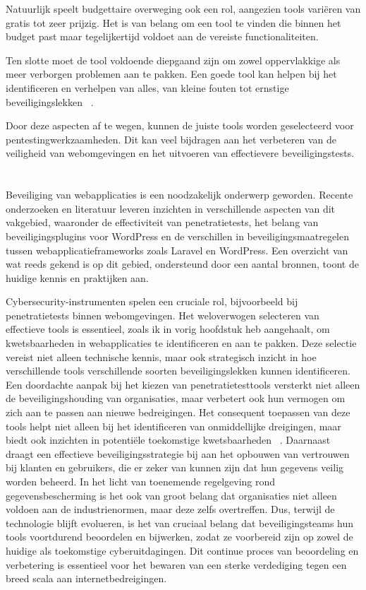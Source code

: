 Natuurlijk speelt budgettaire overweging ook een rol, aangezien tools variëren van gratis tot zeer prijzig. Het 
is van belang om een tool te vinden die binnen het budget past maar tegelijkertijd voldoet aan de vereiste functionaliteiten.

Ten slotte moet de tool voldoende diepgaand zijn om zowel oppervlakkige als meer verborgen problemen aan te pakken. 
Een goede tool kan helpen bij het identificeren en verhelpen van alles, van kleine fouten tot ernstige beveiligingslekken
~\autocite{Maji2022}.

Door deze aspecten af te wegen, kunnen de juiste tools worden geselecteerd voor pentestingwerkzaamheden. 
Dit kan veel bijdragen aan het verbeteren van de veiligheid van webomgevingen en het uitvoeren van effectievere beveiligingstests.

\section{}
\label{sec:wat-weten-we-uit-de-literatuur}
Beveiliging van webapplicaties is een noodzakelijk onderwerp geworden. Recente onderzoeken en literatuur leveren 
inzichten in verschillende aspecten van dit vakgebied, waaronder de effectiviteit van penetratietests, het belang van beveiligingsplugins voor WordPress en de verschillen 
in beveiligingsmaatregelen tussen webapplicatieframeworks zoals Laravel en WordPress. Een overzicht van wat reeds gekend is op dit gebied, ondersteund door een aantal 
bronnen, toont de huidige kennis en praktijken aan.

Cybersecurity-instrumenten spelen een cruciale rol, bijvoorbeeld bij penetratietests binnen webomgevingen. Het weloverwogen 
selecteren van effectieve tools is essentieel, zoals ik in vorig hoofdstuk heb aangehaalt, om kwetsbaarheden in webapplicaties te identificeren en aan te pakken. 
Deze selectie vereist niet alleen technische kennis, maar ook strategisch inzicht in hoe verschillende tools verschillende 
soorten beveiligingslekken kunnen identificeren.
Een doordachte aanpak bij het kiezen van penetratietesttools versterkt niet alleen de beveiligingshouding 
van organisaties, maar verbetert ook hun vermogen om zich aan te passen aan nieuwe bedreigingen. Het consequent toepassen 
van deze tools helpt niet alleen bij het identificeren van onmiddellijke dreigingen, maar biedt ook inzichten in potentiële 
toekomstige kwetsbaarheden ~\autocite{Albahar2022}.
Daarnaast draagt een effectieve beveiligingsstrategie bij aan het opbouwen van vertrouwen bij klanten en gebruikers, die er 
zeker van kunnen zijn dat hun gegevens veilig worden beheerd. In het licht van toenemende regelgeving rond gegevensbescherming 
is het ook van groot belang dat organisaties niet alleen voldoen aan de industrienormen, maar deze zelfs overtreffen.
Dus, terwijl de technologie blijft evolueren, is het van cruciaal belang dat beveiligingsteams hun tools voortdurend 
beoordelen en bijwerken, zodat ze voorbereid zijn op zowel de huidige als toekomstige cyberuitdagingen. Dit continue 
proces van beoordeling en verbetering is essentieel voor het bewaren van een sterke verdediging tegen een breed scala 
aan internetbedreigingen.

